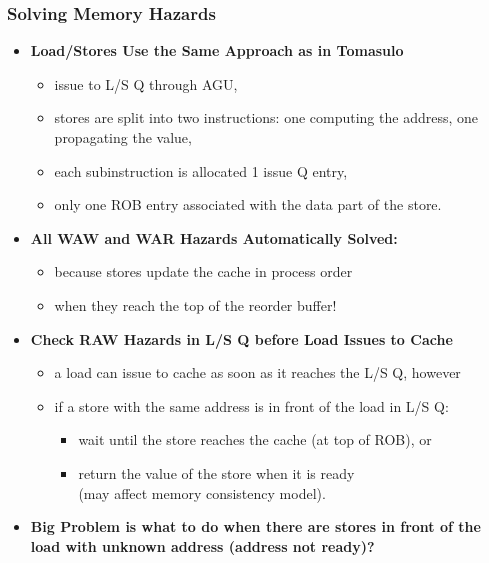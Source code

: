 \documentclass{beamer}
\newcommand{\emp}[1]{\textcolor{DikuRed}{ #1}}
\begin{document}
\begin{frame}[fragile,t]
\frametitle{Solving Memory Hazards}

\begin{itemize}
\item \emp{\bf Load/Stores Use the Same Approach as in Tomasulo}\smallskip
\begin{itemize}
    \item issue to L/S Q through AGU,
    \item stores are split into two instructions: one computing the address,
            one propagating the value,
    \item each subinstruction is allocated 1 issue Q entry,
    \item only one ROB entry associated with the data part of the store.
\end{itemize}\medskip

\item \emp{\bf All WAW and WAR Hazards Automatically Solved:}
\begin{itemize}
    \item because stores update the cache in process order 
    \item when they reach the top of the reorder buffer!
\end{itemize}\medskip

\item \emp{\bf Check RAW Hazards in L/S Q before Load Issues to Cache}
\begin{itemize}
    \item a load can issue to cache as soon as it reaches the L/S Q, however
    \item if a store with the same address is in front of
            the load in L/S Q:
    \begin{itemize}
        \item wait until the store reaches the cache (at top of ROB), or
        \item return the value of the store when it is ready\\
                (may affect memory consistency model).
    \end{itemize}
\end{itemize}\medskip

\item \emp{\bf Big Problem is what to do when there are stores in front of the load with unknown address (address not ready)?}
\end{itemize}

\end{frame}
\end{document}
